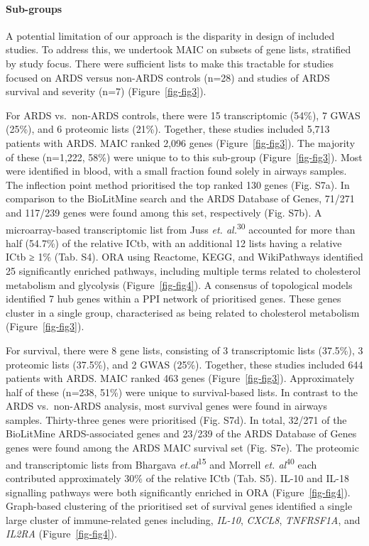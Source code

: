 \documentclass[
  11,
  a4paper,
]{article}
\let\oldparagraph\paragraph
\renewcommand{\paragraph}[1]{\oldparagraph{#1}\mbox{}}
\begin{document}
\paragraph{Sub-groups}\label{sub-groups}

A potential limitation of our approach is the disparity in design of
included studies. To address this, we undertook MAIC on subsets of gene
lists, stratified by study focus. There were sufficient lists to make
this tractable for studies focused on ARDS versus non-ARDS controls
(n=28) and studies of ARDS survival and severity (n=7)
(Figure~\ref{fig-fig3}).

For ARDS vs.~non-ARDS controls, there were 15 transcriptomic (54\%), 7
GWAS (25\%), and 6 proteomic lists (21\%). Together, these studies
included 5,713 patients with ARDS. MAIC ranked 2,096 genes
(Figure~\ref{fig-fig3}). The majority of these (n=1,222, 58\%) were
unique to to this sub-group (Figure~\ref{fig-fig3}). Most were
identified in blood, with a small fraction found solely in airways
samples. The inflection point method prioritised the top ranked 130
genes (Fig. S7a). In comparison to the BioLitMine search and the ARDS
Database of Genes, 71/271 and 117/239 genes were found among this set,
respectively (Fig. S7b). A microarray-based transcriptomic list from
Juss \emph{et. al.}\textsuperscript{30} accounted for more than half
(54.7\%) of the relative ICtb, with an additional 12 lists having a
relative ICtb ≥ 1\% (Tab. S4). ORA using Reactome, KEGG, and
WikiPathways identified 25 significantly enriched pathways, including
multiple terms related to cholesterol metabolism and glycolysis
(Figure~\ref{fig-fig4}). A consensus of topological models identified 7
hub genes within a PPI network of prioritised genes. These genes cluster
in a single group, characterised as being related to cholesterol
metabolism (Figure~\ref{fig-fig3}).

For survival, there were 8 gene lists, consisting of 3 transcriptomic
lists (37.5\%), 3 proteomic lists (37.5\%), and 2 GWAS (25\%). Together,
these studies included 644 patients with ARDS. MAIC ranked 463 genes
(Figure~\ref{fig-fig3}). Approximately half of these (n=238, 51\%) were
unique to survival-based lists. In contrast to the ARDS vs.~non-ARDS
analysis, most survival genes were found in airways samples.
Thirty-three genes were prioritised (Fig. S7d). In total, 32/271 of the
BioLitMine ARDS-associated genes and 23/239 of the ARDS Database of
Genes genes were found among the ARDS MAIC survival set (Fig. S7e). The
proteomic and transcriptomic lists from Bhargava
\emph{et.al}\textsuperscript{15} and Morrell \emph{et.
al}\textsuperscript{40} each contributed approximately 30\% of the
relative ICtb (Tab. S5). IL-10 and IL-18 signalling pathways were both
significantly enriched in ORA (Figure~\ref{fig-fig4}). Graph-based
clustering of the prioritised set of survival genes identified a single
large cluster of immune-related genes including, \emph{IL-10},
\emph{CXCL8}, \emph{TNFRSF1A}, and \emph{IL2RA} (Figure~\ref{fig-fig4}).
\end{document}
